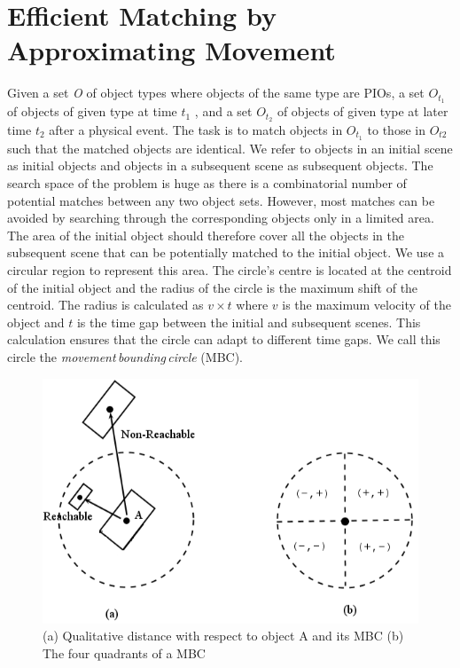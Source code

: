 \documentclass[letterpaper]{article}
\begin{document}
\section{Efficient Matching by Approximating Movement}\label{approxM}
Given a set \emph{O} of object types where objects of the same type are PIOs, a set $O_{t_1}$ of objects of given type at time $t_1$ , and a set $O_{t_2}$ of objects of given type at later time $t_2$ after a physical event. The task is to match objects in $O_{t_1}$ to those in $O_{t2}$ such that the matched objects are identical. We refer to objects in an initial scene as initial objects and objects in a subsequent scene as subsequent objects. The search space of the problem is huge as there is a combinatorial number of potential matches between any two object sets. However, most matches can be avoided by searching through the corresponding objects only in a limited area. The area of the initial object should therefore cover all the objects in the subsequent scene that can be potentially matched to the initial object.  We use a circular region to represent this area. The circle's centre is located at the centroid of the initial object and the radius of the circle is the maximum shift of the centroid. The radius is calculated as $v \times t$ where $v$ is the maximum velocity of the object and $t$ is the time gap between the initial and subsequent scenes. This calculation ensures that the circle can adapt to different time gaps. We call this circle the \emph{movement\,bounding\,circle} (MBC).  
\begin{figure}[t]
\centering\includegraphics[scale=0.3]{quadrants.png}
\vspace{-3mm}
\caption{(a) Qualitative distance with respect to object A and its MBC (b)  The four quadrants of a MBC }
\label{Quadrants}
\vspace{-7mm}
\end{figure}
\end{document}
